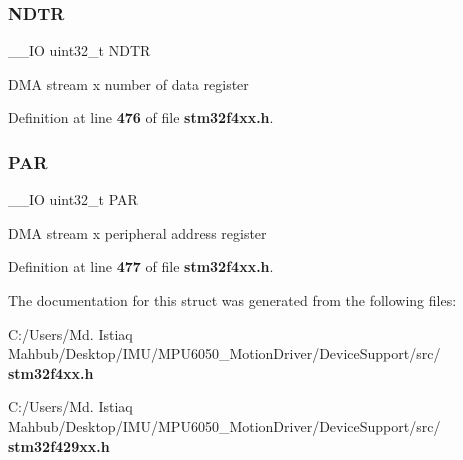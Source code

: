 \subsubsection{N\+D\+TR}
{\footnotesize\ttfamily \+\_\+\+\_\+\+IO uint32\+\_\+t N\+D\+TR}

D\+MA stream x number of data register 

Definition at line \textbf{ 476} of file \textbf{ stm32f4xx.\+h}.

\mbox{\label{structDMA__Stream__TypeDef_aef55be3d948c22dd32a97e8d4f8761fd}} 
\subsubsection{P\+AR}
{\footnotesize\ttfamily \+\_\+\+\_\+\+IO uint32\+\_\+t P\+AR}

D\+MA stream x peripheral address register 

Definition at line \textbf{ 477} of file \textbf{ stm32f4xx.\+h}.



The documentation for this struct was generated from the following files\+:\begin{DoxyCompactItemize}
\item 
C\+:/\+Users/\+Md. Istiaq Mahbub/\+Desktop/\+I\+M\+U/\+M\+P\+U6050\+\_\+\+Motion\+Driver/\+Device\+Support/src/\textbf{ stm32f4xx.\+h}\item 
C\+:/\+Users/\+Md. Istiaq Mahbub/\+Desktop/\+I\+M\+U/\+M\+P\+U6050\+\_\+\+Motion\+Driver/\+Device\+Support/src/\textbf{ stm32f429xx.\+h}\end{DoxyCompactItemize}
